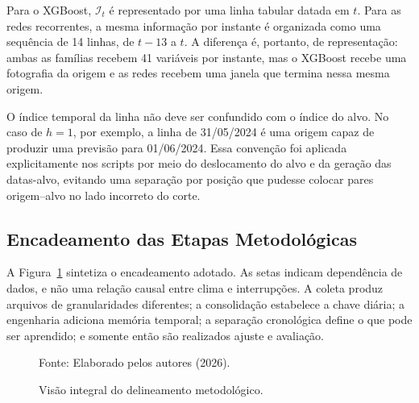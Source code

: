Para o XGBoost, $\mathcal{I}_t$ é representado por uma linha tabular datada em $t$. Para as redes recorrentes, a mesma informação por instante é organizada como uma sequência de 14 linhas, de $t-13$ a $t$. A diferença é, portanto, de representação: ambas as famílias recebem 41 variáveis por instante, mas o XGBoost recebe uma fotografia da origem e as redes recebem uma janela que termina nessa mesma origem.

O índice temporal da linha não deve ser confundido com o índice do alvo. No caso de $h=1$, por exemplo, a linha de 31/05/2024 é uma origem capaz de produzir uma previsão para 01/06/2024. Essa convenção foi aplicada explicitamente nos scripts por meio do deslocamento do alvo e da geração das datas-alvo, evitando uma separação por posição que pudesse colocar pares origem--alvo no lado incorreto do corte.

\subsection{Encadeamento das Etapas Metodológicas}

A Figura~\ref{fig:visao_metodologica_integral} sintetiza o encadeamento adotado. As setas indicam dependência de dados, e não uma relação causal entre clima e interrupções. A coleta produz arquivos de granularidades diferentes; a consolidação estabelece a chave diária; a engenharia adiciona memória temporal; a separação cronológica define o que pode ser aprendido; e somente então são realizados ajuste e avaliação.

\begin{figure}[H]
\centering
{}
\caption{Visão integral do delineamento metodológico.}
\small{Fonte: Elaborado pelos autores (2026).}
\label{fig:visao_metodologica_integral}
\end{figure}

